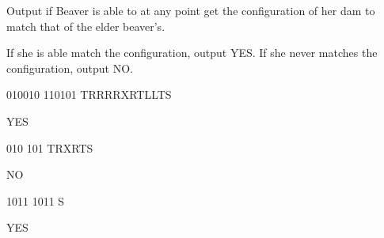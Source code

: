 \newpage

\begin{formalout}
Output if Beaver is able to at any point get the configuration of her dam to match that of the elder beaver's.

If she is able match the configuration, output YES.
If she never matches the configuration, output NO.
\end{formalout}

\begin{datain}
010010
110101
TRRRRXRTLLTS
\end{datain}
\begin{dataout}
YES
\end{dataout}

\begin{datain}
010
101
TRXRTS
\end{datain}
\begin{dataout}
NO
\end{dataout}

\begin{datain}
1011
1011
S
\end{datain}
\begin{dataout}
YES
\end{dataout}
